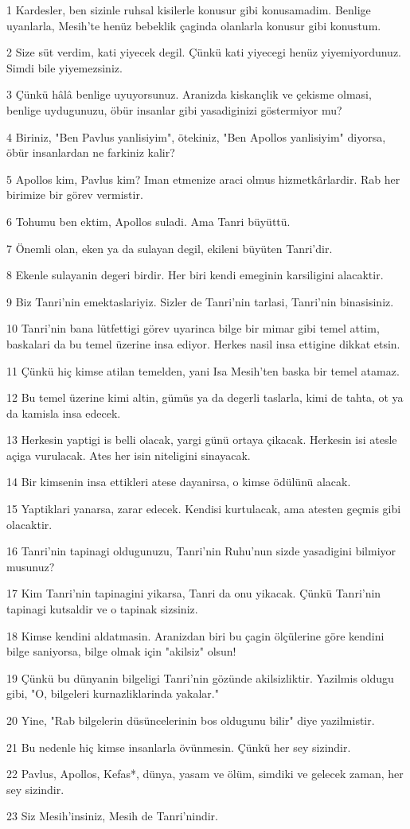 \par 1 Kardesler, ben sizinle ruhsal kisilerle konusur gibi konusamadim. Benlige uyanlarla, Mesih'te henüz bebeklik çaginda olanlarla konusur gibi konustum.
\par 2 Size süt verdim, kati yiyecek degil. Çünkü kati yiyecegi henüz yiyemiyordunuz. Simdi bile yiyemezsiniz.
\par 3 Çünkü hâlâ benlige uyuyorsunuz. Aranizda kiskançlik ve çekisme olmasi, benlige uydugunuzu, öbür insanlar gibi yasadiginizi göstermiyor mu?
\par 4 Biriniz, "Ben Pavlus yanlisiyim", ötekiniz, "Ben Apollos yanlisiyim" diyorsa, öbür insanlardan ne farkiniz kalir?
\par 5 Apollos kim, Pavlus kim? Iman etmenize araci olmus hizmetkârlardir. Rab her birimize bir görev vermistir.
\par 6 Tohumu ben ektim, Apollos suladi. Ama Tanri büyüttü.
\par 7 Önemli olan, eken ya da sulayan degil, ekileni büyüten Tanri'dir.
\par 8 Ekenle sulayanin degeri birdir. Her biri kendi emeginin karsiligini alacaktir.
\par 9 Biz Tanri'nin emektaslariyiz. Sizler de Tanri'nin tarlasi, Tanri'nin binasisiniz.
\par 10 Tanri'nin bana lütfettigi görev uyarinca bilge bir mimar gibi temel attim, baskalari da bu temel üzerine insa ediyor. Herkes nasil insa ettigine dikkat etsin.
\par 11 Çünkü hiç kimse atilan temelden, yani Isa Mesih'ten baska bir temel atamaz.
\par 12 Bu temel üzerine kimi altin, gümüs ya da degerli taslarla, kimi de tahta, ot ya da kamisla insa edecek.
\par 13 Herkesin yaptigi is belli olacak, yargi günü ortaya çikacak. Herkesin isi atesle açiga vurulacak. Ates her isin niteligini sinayacak.
\par 14 Bir kimsenin insa ettikleri atese dayanirsa, o kimse ödülünü alacak.
\par 15 Yaptiklari yanarsa, zarar edecek. Kendisi kurtulacak, ama atesten geçmis gibi olacaktir.
\par 16 Tanri'nin tapinagi oldugunuzu, Tanri'nin Ruhu'nun sizde yasadigini bilmiyor musunuz?
\par 17 Kim Tanri'nin tapinagini yikarsa, Tanri da onu yikacak. Çünkü Tanri'nin tapinagi kutsaldir ve o tapinak sizsiniz.
\par 18 Kimse kendini aldatmasin. Aranizdan biri bu çagin ölçülerine göre kendini bilge saniyorsa, bilge olmak için "akilsiz" olsun!
\par 19 Çünkü bu dünyanin bilgeligi Tanri'nin gözünde akilsizliktir. Yazilmis oldugu gibi, "O, bilgeleri kurnazliklarinda yakalar."
\par 20 Yine, "Rab bilgelerin düsüncelerinin bos oldugunu bilir" diye yazilmistir.
\par 21 Bu nedenle hiç kimse insanlarla övünmesin. Çünkü her sey sizindir.
\par 22 Pavlus, Apollos, Kefas*, dünya, yasam ve ölüm, simdiki ve gelecek zaman, her sey sizindir.
\par 23 Siz Mesih'insiniz, Mesih de Tanri'nindir.

